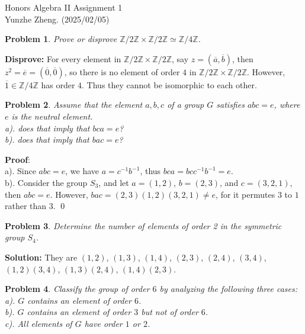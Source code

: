 \documentclass[12pt]{article}
\newtheorem{problem}{Problem}
\begin{document}
\noindent Honors Algebra II \hfill Assignment 1\\
Yunzhe Zheng. (2025/02/05)

\hrulefill

\begin{problem}
Prove or disprove $\mathbb{Z}/2\mathbb{Z} \times \mathbb{Z}/2\mathbb{Z}\simeq \mathbb{Z} / 4\mathbb{Z}$.
\end{problem}

\textbf{Disprove:} For every element in $\mathbb{Z}/2\mathbb{Z}\times\mathbb{Z}/2\mathbb{Z}$, say $z = (\overline{a}, \overline{b})$, then $z^{2} = \overline{e} = (\overline{0}, \overline{0})$, so there is no element of order $4$ in $\mathbb{Z}/2\mathbb{Z}\times\mathbb{Z}/2\mathbb{Z}$. However, $\overline{1}\in \mathbb{Z}/4\mathbb{Z}$ has order $4$. Thus they cannot be isomorphic to each other.

\begin{problem}
Assume that the element $a, b, c$ of a group $G$ satisfies $abc = e$, where $e$ is the neutral element. \\
\indent a). does that imply that $bca = e$? \\
\indent b). does that imply that $bac = e$? 

\end{problem}

\textbf{Proof}: \\
\indent a). Since $abc = e$, we have $a = c^{-1}b^{-1}$, thus $bca = bcc^{-1}b^{-1}=e$. \\
\indent b). Consider the group $S_{3}$, and let $a = (1, 2)$, $b = (2, 3)$, and $c = (3, 2, 1)$, then $abc = e$. However, $bac = (2, 3)(1, 2)(3, 2, 1)\neq e$, for it permutes $3$ to $1$ rather than $3$. \qed

\begin{problem}
Determine the number of elements of order 2 in the symmetric group $S_{4}$.
\end{problem}

\textbf{Solution:} They are $(1, 2)$, $(1, 3)$, $(1, 4)$, $(2, 3)$, $(2, 4)$, $(3, 4)$, $(1, 2)(3, 4)$, $(1, 3)(2, 4)$, $(1, 4)(2, 3)$.

\begin{problem}
Classify the group of order $6$ by analyzing the following three cases: \\
\indent a). $G$ contains an element of order $6$. \\ 
\indent b). $G$ contains an element of order $3$ but not of order $6$. \\
\indent c). All elements of $G$ have order $1$ or $2$.

\end{problem}
\end{document}
